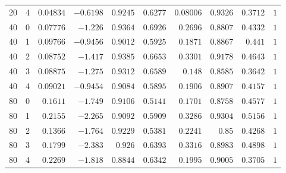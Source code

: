 \begin{table}[ht]
\begin{tabular}{@{}rrrrrrrrrr@{}}
20 & 4 & $0.04834$ & $-0.6198$ & $0.9245$ & $0.6277$ & $0.08006$ & $0.9326$ & $0.3712$ & $1$\\
40 & 0 & $0.07776$ & $-1.226$ & $0.9364$ & $0.6926$ & $0.2696$ & $0.8807$ & $0.4332$ & $1$\\
40 & 1 & $0.09766$ & $-0.9456$ & $0.9012$ & $0.5925$ & $0.1871$ & $0.8867$ & $0.441$ & $1$\\
40 & 2 & $0.08752$ & $-1.417$ & $0.9385$ & $0.6653$ & $0.3301$ & $0.9178$ & $0.4643$ & $1$\\
40 & 3 & $0.08875$ & $-1.275$ & $0.9312$ & $0.6589$ & $0.148$ & $0.8585$ & $0.3642$ & $1$\\
40 & 4 & $0.09021$ & $-0.9454$ & $0.9084$ & $0.5895$ & $0.1906$ & $0.8907$ & $0.4157$ & $1$\\
80 & 0 & $0.1611$ & $-1.749$ & $0.9106$ & $0.5141$ & $0.1701$ & $0.8758$ & $0.4577$ & $1$\\
80 & 1 & $0.2155$ & $-2.265$ & $0.9092$ & $0.5909$ & $0.3286$ & $0.9304$ & $0.5156$ & $1$\\
80 & 2 & $0.1366$ & $-1.764$ & $0.9229$ & $0.5381$ & $0.2241$ & $0.85$ & $0.4268$ & $1$\\
80 & 3 & $0.1799$ & $-2.383$ & $0.926$ & $0.6393$ & $0.3316$ & $0.8983$ & $0.4898$ & $1$\\
80 & 4 & $0.2269$ & $-1.818$ & $0.8844$ & $0.6342$ & $0.1995$ & $0.9005$ & $0.3705$ & $1$\\
\bottomrule
\end{tabular}
\end{table}

